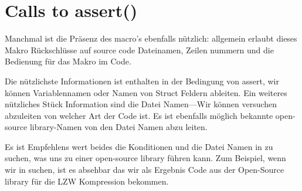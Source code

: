 \section{Calls to assert()}

Manchmal ist die Präsenz des  macro's ebenfalls nützlich:
allgemein erlaubt dieses Makro Rückschlüsse auf source code Dateinamen,
Zeilen nummern und die Bedienung für das Makro im Code.

Die nützlichste Informationen ist enthalten in der Bedingung von assert, wir können Variablennamen oder Namen
von Struct Feldern ableiten. Ein weiteres nützliches Stück Information sind die Datei Namen---Wir können versuchen
abzuleiten von welcher Art der Code ist. 
Es ist ebenfalls möglich bekannte open-source library-Namen von den Datei Namen abzu leiten.



Es ist Empfehlens wert beides die Konditionen und die Datei Namen in  zu suchen, was uns zu einer open-source library führen kann.
Zum Beispiel, wenn wir  in  suchen, ist es absehbar das wir als Ergebnis Code aus der 
Open-Source library für die LZW Kompression bekommen. %

